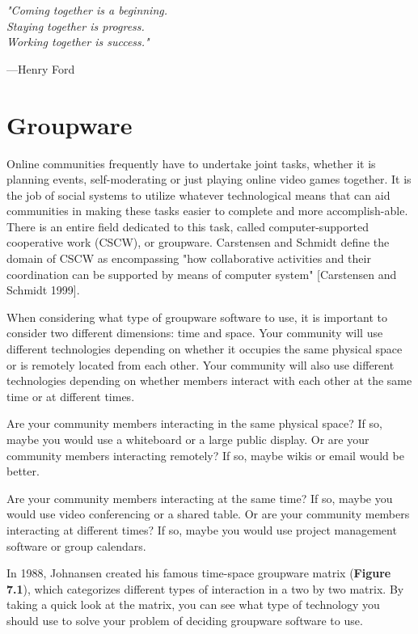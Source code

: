 \documentclass[class=book, crop=false]{standalone}
\begin{document}
\epigraph{\itshape "Coming together is a beginning.\\Staying together is progress.\\Working together is success."}{---Henry Ford}

\section{Groupware}

Online communities frequently have to undertake joint tasks, whether it is planning events, self-moderating or just playing online video games together. It is the job of social systems to utilize whatever technological means that can aid communities in making these tasks easier to complete and more accomplish-able. There is an entire field dedicated to this task, called computer-supported cooperative work (CSCW), or groupware. Carstensen and Schmidt define the domain of CSCW as encompassing "how collaborative activities and their coordination can be supported by means of computer system" [Carstensen and Schmidt 1999].

When considering what type of groupware software to use, it is important to consider two different dimensions: time and space. Your community will use different technologies depending on whether it occupies the same physical space or is remotely located from each other. Your community will also use different technologies depending on whether members interact with each other at the same time or at different times.

Are your community members interacting in the same physical space? If so, maybe you would use a whiteboard or a large public display. Or are your community members interacting remotely? If so, maybe wikis or email would be better.

Are your community members interacting at the same time? If so, maybe you would use video conferencing or a shared table. Or are your community members interacting at different times? If so, maybe you would use project management software or group calendars.

In 1988, Johnansen created his famous time-space groupware matrix (\textbf{Figure 7.1}), which categorizes different types of interaction in a two by two matrix. By taking a quick look at the matrix, you can see what type of technology you should use to solve your problem of deciding groupware software to use.
\end{document}
